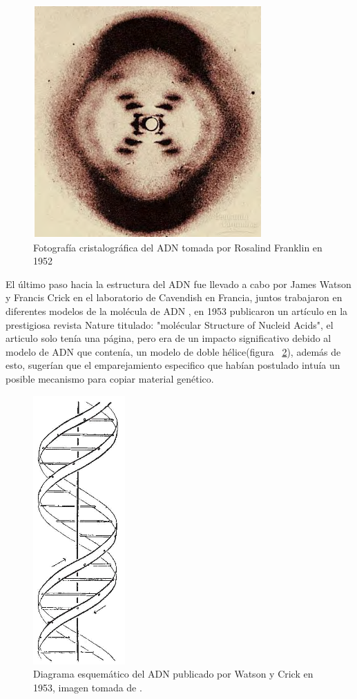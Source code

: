 \begin{figure}[htbp]
    \centering
    \includegraphics[width=0.5\linewidth]{./Figures/RF.png}
    \caption[Fotografía cristalográfica del ADN]{Fotografía cristalográfica del ADN tomada por Rosalind Franklin en 1952}
    \label{fig:rf}
\end{figure}
El último paso hacia la estructura del ADN fue llevado a cabo por James Watson y Francis Crick en el laboratorio de Cavendish en Francia, juntos trabajaron en diferentes modelos de la molécula de ADN , en 1953 publicaron un artículo en la prestigiosa revista Nature titulado: "molécular Structure of Nucleid Acids", el articulo solo tenía una página, pero era de un impacto significativo debido al modelo de ADN que contenía, un modelo de doble hélice(figura ~\ref{fig:jw}), además de esto, sugerían que el emparejamiento  especifico que habían postulado intuía un posible mecanismo para copiar material genético.
\begin{figure}[htbp]
    \centering
    \includegraphics[width=0.15\linewidth]{./Figures/DNA1.png}
    \caption[Diagrama esquemático del ADN]{Diagrama esquemático del ADN publicado por Watson y Crick en 1953, imagen tomada de \cite{jwfc}.}
    \label{fig:jw}
\end{figure}
